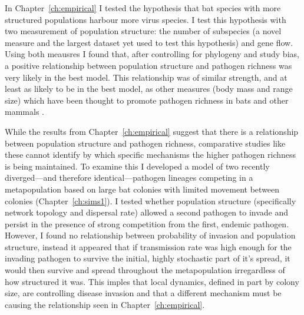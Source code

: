 


In Chapter~\ref{ch:empirical} I tested the hypothesis that bat species with more structured populations harbour more virus species.
I test this hypothesis with two measurement of population structure: the number of subspecies (a novel measure and the largest dataset yet used to test this hypothesis) and gene flow.
Using both meausres I found that, after controlling for phylogeny and study bias, a positive relationship between population structure and pathogen richness was very likely in the best model.
This relationship was of similar strength, and at least as likely to be in the best model, as other measures (body mass and range size) which have been thought to promote pathogen richness in bats and other mammals \cite{kamiya2014determines, arneberg2002host, gay2014parasite, nunn2003comparative, turmelle2009correlates}.




While the results from Chapter~\ref{ch:empirical} suggest that there is a relationship between population structure and pathogen richness, comparative studies like these cannot identify by which specific mechanisms the higher pathogen richness is being maintained.
To examine this I developed a model of two recently diverged---and therefore identical---pathogen lineages competing in a metapopulation based on large bat colonies with limited movement between colonies (Chapter~\ref{ch:sims1}). 
I tested whether population structure (specifically network topology and dispersal rate) allowed a second pathogen to invade and persist in the presence of strong competition from the first, endemic pathogen.
However, I found no relationship between probability of invasion and population structure, instead it appeared that if transmission rate was high enough for the invading pathogen to survive the initial, highly stochastic part of it's spread, it would then survive and spread throughout the metapopulation irregardless of how structured it was.
This imples that local dynamics, defined in part by colony size, are controlling disease invasion and that a different mechanism must be causing the relationship seen in Chapter~\ref{ch:empirical}.


